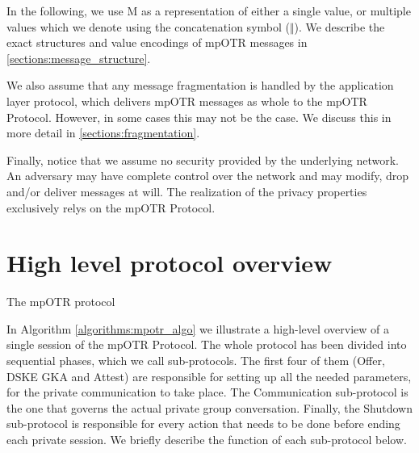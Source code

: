 In the following, we use M as a representation of either a single value, or multiple values which we denote using the concatenation symbol ($\Vert$). We describe the exact structures and value encodings of mpOTR messages in \ref{sections:message_structure}.

We also assume that any message fragmentation is handled by the application layer protocol, which delivers mpOTR messages as whole to the mpOTR Protocol. However, in some cases this may not be the case. We discuss this in more detail in \ref{sections:fragmentation}.

Finally, notice that we assume no security provided by the underlying network. An adversary may have complete control over the network and may modify, drop and/or deliver messages at will. The realization of the privacy properties exclusively relys on the mpOTR Protocol.

\section{High level protocol overview}
\begin{algorithm}[H]
  \label{algorithms:mpotr_algo}
  \caption{The mpOTR protocol}
\end{algorithm}

In Algorithm \ref{algorithms:mpotr_algo} we illustrate a high-level overview of a single session of the mpOTR Protocol. The whole protocol has been divided into sequential phases, which we call sub-protocols. The first four of them (Offer, DSKE GKA and Attest) are responsible for setting up all the needed parameters, for the private communication to take place. The Communication sub-protocol is the one that governs the actual private group conversation. Finally, the Shutdown sub-protocol is responsible for every action that needs to be done before ending each private session. We briefly describe the function of each sub-protocol below.

